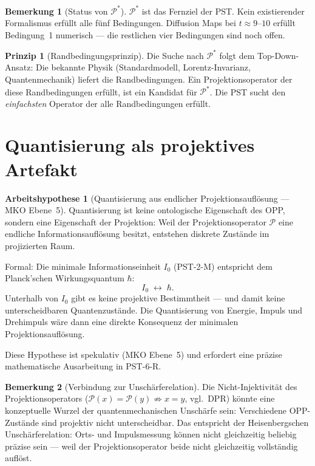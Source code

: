 \documentclass[11pt,a4paper]{article}
\theoremstyle{plain}
\theoremstyle{definition}
\newtheorem{remark}{Bemerkung}[section]
\newtheorem{hypothese}{Arbeitshypothese}[section]
\newtheorem{prinzip}{Prinzip}[section]
\newcommand{\Proj}{\mathcal{P}}
\begin{document}
\begin{remark}[Status von $\Proj^\ast$]
$\Proj^\ast$ ist das Fernziel der PST. Kein existierender Formalismus
erf\"{u}llt alle f\"{u}nf Bedingungen. Diffusion Maps bei $t \approx 9$--$10$
erf\"{u}llt Bedingung~1 numerisch --- die restlichen vier Bedingungen
sind noch offen.
\end{remark}

\begin{prinzip}[Randbedingungsprinzip]
Die Suche nach $\Proj^\ast$ folgt dem Top-Down-Ansatz: Die bekannte
Physik (Standardmodell, Lorentz-Invarianz, Quantenmechanik) liefert
die Randbedingungen. Ein Projektionsoperator der diese Randbedingungen
erf\"{u}llt, ist ein Kandidat f\"{u}r $\Proj^\ast$. Die PST sucht den
\emph{einfachsten} Operator der alle Randbedingungen erf\"{u}llt.
\end{prinzip}

\section{Quantisierung als projektives Artefakt}

\begin{hypothese}[Quantisierung aus endlicher Projektionsaufl\"{o}sung
--- MKO Ebene~5]
Quantisierung ist keine ontologische Eigenschaft des OPP, sondern
eine Eigenschaft der Projektion: Weil der Projektionsoperator
$\Proj$ eine endliche Informationsaufl\"{o}sung besitzt, entstehen
diskrete Zust\"{a}nde im projizierten Raum.

Formal: Die minimale Informationseinheit $I_0$ (PST-2-M) entspricht
dem Planck'schen Wirkungsquantum $\hbar$:
\[
  I_0 \;\leftrightarrow\; \hbar.
\]
Unterhalb von $I_0$ gibt es keine projektive Bestimmtheit --- und damit
keine unterscheidbaren Quantenzust\"{a}nde. Die Quantisierung von Energie,
Impuls und Drehimpuls w\"{a}re dann eine direkte Konsequenz der minimalen
Projektionsaufl\"{o}sung.

Diese Hypothese ist spekulativ (MKO Ebene~5) und erfordert eine
pr\"{a}zise mathematische Ausarbeitung in PST-6-R.
\end{hypothese}

\begin{remark}[Verbindung zur Unsch\"{a}rferelation]
Die Nicht-Injektivit\"{a}t des Projektionsoperators ($\Proj(x) = \Proj(y)
\not\Rightarrow x = y$, vgl.\ DPR) k\"{o}nnte eine konzeptuelle Wurzel
der quantenmechanischen Unsch\"{a}rfe sein: Verschiedene OPP-Zust\"{a}nde
sind projektiv nicht unterscheidbar. Das entspricht der Heisenbergschen
Unsch\"{a}rferelation: Orts- und Impulsmessung k\"{o}nnen nicht gleichzeitig
beliebig pr\"{a}zise sein --- weil der Projektionsoperator beide nicht
gleichzeitig vollst\"{a}ndig aufl\"{o}st.
\end{remark}
\end{document}
